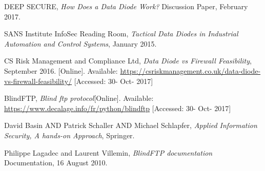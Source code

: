 \documentclass[a4paper,10pt]{article}
\begin{document}
\clearpage
\begin{thebibliography}{9}
DEEP SECURE,
\textit{How	Does a Data Diode Work?}
Discussion Paper, February 2017.

SANS Institute InfoSec Reading Room,
\textit{Tactical Data Diodes in Industrial Automation and Control Systems}, January 2015.

CS Risk Management and Compliance Ltd,
\textit{Data Diode vs Firewall Feasibility}, September 2016. [Online]. Available: \url{https://csriskmanagement.co.uk/data-diode-vs-firewall-feasibility/} [Accessed: 30- Oct- 2017]

BlindFTP,
\textit{Blind ftp protocol}[Online]. Available: \url{https://www.decalage.info/fr/python/blindftp} [Accessed: 30- Oct- 2017]

David Basin AND Patrick Schaller AND Michael Schlapfer,
\textit{Applied Information Security, A hands-on Approach},
Springer.

Philippe Lagadec and Laurent Villemin,
\textit{BlindFTP documentation}
Documentation,
16 August 2010.




\end{thebibliography}
\end{document}
